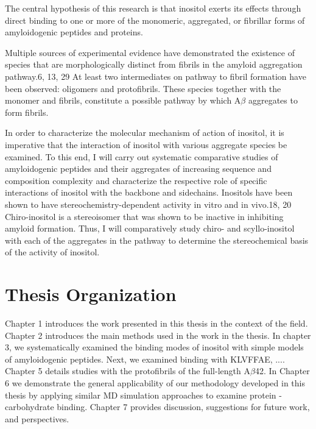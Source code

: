 The central hypothesis of this research is that inositol exerts its effects through direct binding to one or more of the monomeric, aggregated, or fibrillar forms of amyloidogenic peptides and proteins.   

Multiple sources of experimental evidence have demonstrated the existence of species that are morphologically distinct from fibrils in the amyloid aggregation pathway.6, 13, 29 At least two intermediates on pathway to fibril formation have been observed: oligomers and protofibrils. These species together with the monomer and fibrils, constitute a possible pathway by which A$\beta$ aggregates to form fibrils. 

In order to characterize the molecular mechanism of action of inositol, it is imperative that the interaction of inositol with various aggregate species be examined. To this end, I will carry out systematic comparative studies of amyloidogenic peptides and their aggregates of increasing sequence and composition complexity and characterize the respective role of specific interactions of inositol with the backbone and sidechains. Inositols have been shown to have stereochemistry-dependent activity in vitro and in vivo.18, 20 Chiro-inositol is a stereoisomer that was shown to be inactive in inhibiting amyloid formation. Thus, I will comparatively study chiro- and scyllo-inositol with each of the aggregates in the pathway to determine the stereochemical basis of the activity of inositol.

\section{Thesis Organization}
Chapter 1 introduces the work presented in this thesis in the context of the field. Chapter 2 introduces the main methods used in the work in the thesis.   In chapter 3, we systematically examined the binding modes of inositol with simple models of amyloidogenic peptides. Next, we examined binding with KLVFFAE, .... Chapter 5 details studies with the protofibrils of the full-length A$\beta$42. In Chapter 6 we demonstrate the general applicability of our methodology developed in this thesis by applying similar MD simulation approaches to examine protein - carbohydrate binding. Chapter 7 provides discussion, suggestions for future work, and perspectives.





